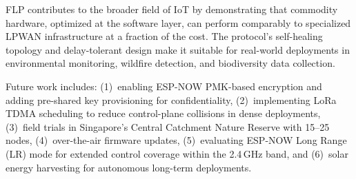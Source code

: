 \documentclass[conference]{IEEEtran}
\begin{document}
FLP contributes to the broader field of IoT by demonstrating that commodity hardware, optimized at the software layer, can perform comparably to specialized LPWAN infrastructure at a fraction of the cost. The protocol's self-healing topology and delay-tolerant design make it suitable for real-world deployments in environmental monitoring, wildfire detection, and biodiversity data collection.

Future work includes: (1)~enabling ESP-NOW PMK-based encryption and adding pre-shared key provisioning for confidentiality, (2)~implementing LoRa TDMA scheduling to reduce control-plane collisions in dense deployments, (3)~field trials in Singapore's Central Catchment Nature Reserve with 15--25 nodes, (4)~over-the-air firmware updates, (5)~evaluating ESP-NOW Long Range (LR) mode for extended control coverage within the 2.4\,GHz band, and (6)~solar energy harvesting for autonomous long-term deployments.
\end{document}
